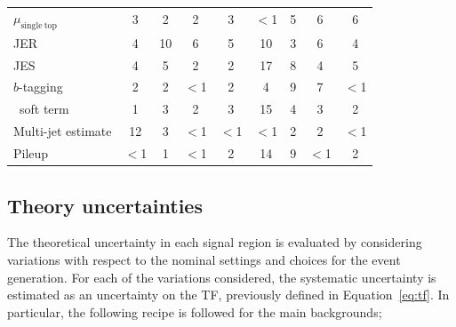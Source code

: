 \begin{table}[htpb]
\begin{center}
\begin{tabular}{lcccccccc}
						{$\mu_{\mathrm{single~top}}$} & 3 & 2 & 2 & 3 & {$<$1\phantom{15}} & 5 & 6 & 6\\  
						{JER} & 4 & 10 & 6 & 5 & 10 & 3 & 6 & 4\\  
						{JES} & 4 & 5 & 2 & 2 & 17 & 8 & 4 & 5\\  
						{$b$-tagging} & 2 & 2 & {$<$1\phantom{15}} & 2 & 4 & 9 & 7 & {$<$1\phantom{15}}\\  
						{\met\ soft term} & 1 & 3 & 2 & 3 & 15 & 4 & 3 & 2\\  
						{Multi-jet estimate} & 12 & 3 & {$<$1\phantom{15}} & {$<$1\phantom{15}} & {$<$1\phantom{15}} & 2 & 2 & {$<$1\phantom{15}}\\  
						{Pileup} & {$<$1\phantom{15}} & 1 & {$<$1\phantom{15}} & 2 & 14 & 9 & {$<$1\phantom{15}} & 2\\  
						\bottomrule
					\end{tabular}
				\end{center}
			\end{table}


		\subsection{Theory uncertainties}

			The theoretical uncertainty in each signal region is evaluated by considering variations with respect to the nominal settings and choices for the event generation. For each of the variations considered, the systematic uncertainty is estimated as an uncertainty on the \ac{TF}, previously defined in Equation~\ref{eq:tf}. In particular, the following recipe is followed for the main backgrounds; 

